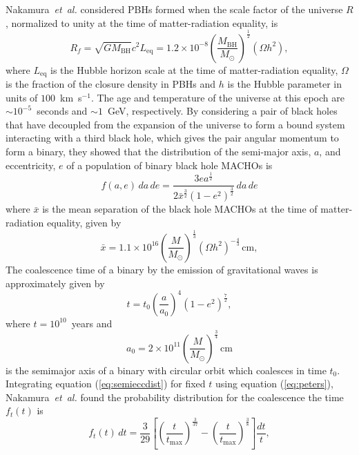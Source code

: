 Nakamura~\emph{et~al.} considered PBHs formed when the scale factor of the
universe $R$, normalized to unity at the time of matter-radiation equality,
is\cite{Nakamura:1997sm}
\begin{equation}
R_f = \sqrt{GM_\mathrm{BH}}{c^2L_\mathrm{eq}} =
1.2\times 10^{-8} \left(\frac{M_\mathrm{BH}}{M_\odot}\right)^\frac{1}{2}
(\Omega h^2),
\end{equation}
where $L_\mathrm{eq}$ is the Hubble horizon scale at the time of
matter-radiation equality, $\Omega$ is the fraction of the closure density in
PBHs and $h$ is the Hubble parameter in units of $100$~km~s$^{-1}$. The age
and temperature of the universe at this epoch are $\sim 10^{-5}$~seconds and
$\sim 1$~GeV, respectively. By considering a pair of black holes that have
decoupled from the expansion of the universe to form a bound system
interacting with a third black hole, which gives the pair angular momentum to
form a binary, they showed that the distribution of the semi-major axis, $a$,
and eccentricity, $e$ of a population of binary black hole MACHOs is
\begin{equation}
f(a,e)\, da\, de = 
\frac{ 3ea^{\frac{1}{2}} }
{ 2\bar{x}^{\frac{3}{2}} (1-e^2)^{\frac{3}{2}}  } \, da\, de 
\label{eq:semieccdist}
\end{equation}
where $\bar{x}$ is the mean separation of the black hole MACHOs at the time of
matter-radiation equality, given by
\begin{equation}
\bar{x} = 1.1 \times 10^{16} \left(\frac{M}{M_\odot}\right)^{\frac{1}{3}}
\left(\Omega h^2\right)^{-\frac{4}{3}} \,\mathrm{cm},
\end{equation}
The coalescence time of a binary by the emission of gravitational waves is
approximately given by
\cite{Peters:1964}
\begin{equation}
t = t_0 \left(\frac{a}{a_0}\right)^4 \left(1 - e^2\right)^{\frac{7}{2}},
\label{eq:peters}
\end{equation}
where $t = 10^{10}$~years and
\begin{equation}
a_0 = 2 \times 10^{11}
\left(\frac{M}{M_\odot}\right)^{\frac{3}{4}}\,\mathrm{cm}
\end{equation}
is the semimajor axis of a binary with circular orbit which coalesces in time
$t_0$. Integrating equation (\ref{eq:semieccdist}) for fixed $t$ using equation
(\ref{eq:peters}), Nakamura~\emph{et~al.} found the probability distribution
for the coalescence the time $f_t(t)$ is
\begin{equation}
f_t(t)\,dt = \frac{3}{29}\left[
\left(\frac{t}{t_\mathrm{max}}\right)^{\frac{3}{37}} -
\left(\frac{t}{t_\mathrm{max}}\right)^{\frac{3}{8}}\right] \frac{dt}{t},
\end{equation}

